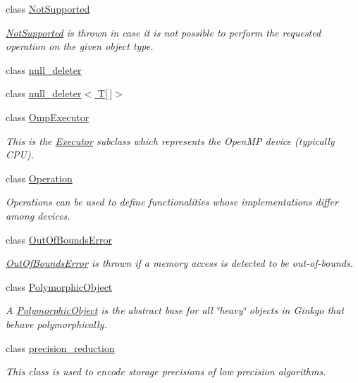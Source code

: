 \begin{DoxyCompactItemize}
class \hyperlink{classgko_1_1NotSupported}{Not\+Supported}
\begin{DoxyCompactList}\small\item\em \hyperlink{classgko_1_1NotSupported}{Not\+Supported} is thrown in case it is not possible to perform the requested operation on the given object type. \end{DoxyCompactList}\item 
class \hyperlink{classgko_1_1null__deleter}{null\+\_\+deleter}
\item 
class \hyperlink{classgko_1_1null__deleter_3_01T[]_4}{null\+\_\+deleter$<$ T\mbox{[}$\,$\mbox{]}$>$}
\item 
class \hyperlink{classgko_1_1OmpExecutor}{Omp\+Executor}
\begin{DoxyCompactList}\small\item\em This is the \hyperlink{classgko_1_1Executor}{Executor} subclass which represents the Open\+MP device (typically C\+PU). \end{DoxyCompactList}\item 
class \hyperlink{classgko_1_1Operation}{Operation}
\begin{DoxyCompactList}\small\item\em Operations can be used to define functionalities whose implementations differ among devices. \end{DoxyCompactList}\item 
class \hyperlink{classgko_1_1OutOfBoundsError}{Out\+Of\+Bounds\+Error}
\begin{DoxyCompactList}\small\item\em \hyperlink{classgko_1_1OutOfBoundsError}{Out\+Of\+Bounds\+Error} is thrown if a memory access is detected to be out-\/of-\/bounds. \end{DoxyCompactList}\item 
class \hyperlink{classgko_1_1PolymorphicObject}{Polymorphic\+Object}
\begin{DoxyCompactList}\small\item\em A \hyperlink{classgko_1_1PolymorphicObject}{Polymorphic\+Object} is the abstract base for all \char`\"{}heavy\char`\"{} objects in Ginkgo that behave polymorphically. \end{DoxyCompactList}\item 
class \hyperlink{classgko_1_1precision__reduction}{precision\+\_\+reduction}
\begin{DoxyCompactList}\small\item\em This class is used to encode storage precisions of low precision algorithms. \end{DoxyCompactList}\item 

\end{DoxyCompactItemize}
